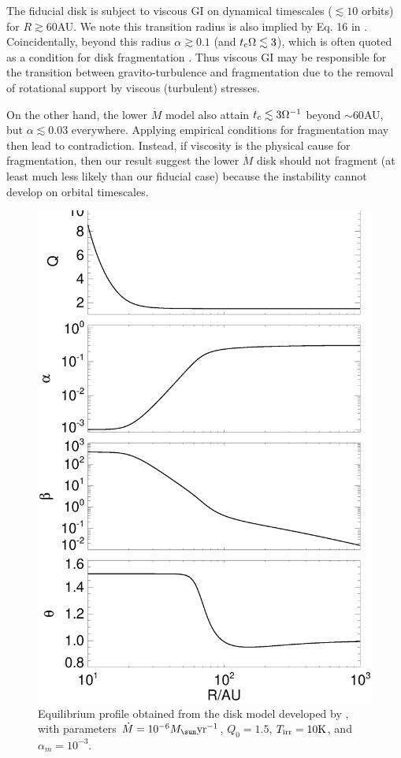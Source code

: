 The fiducial disk is subject to viscous GI on dynamical timescales
($\lesssim 10$ orbits) for $R\gtrsim60$AU. We note this transition
radius is also implied by Eq. 16 in \cite{kratter10}. Coincidentally,
beyond this radius $\alpha\gtrsim 0.1$ (and 
$t_\mathrm{c}\Omega\lesssim 3$), which is often quoted as a condition for disk
fragmentation   
. Thus viscous GI may be responsible for 
the transition between gravito-turbulence and fragmentation due to the
removal of rotational support by viscous (turbulent) stresses. 

On the other hand, the lower $\dot{M}$ model also attain $t_\mathrm{c}\lesssim
3\Omega^{-1}$ beyond $\sim 60$AU, but $\alpha\lesssim 0.03$
everywhere. 
Applying empirical conditions for fragmentation may then lead to
contradiction. Instead, if viscosity is the physical cause for
fragmentation, then our result suggest the lower $\dot{M}$ disk should
not fragment (at least much less likely than our fiducial case) 
because the instability cannot develop on orbital timescales. 

\begin{figure}
  \includegraphics[width=\linewidth,clip=true,trim=0cm 0cm 0cm
    0.0cm]{figures/ppd_2d_basic}
  \caption{Equilibrium profile obtained from the disk model developed
    by \cite{rafikov15}, with parameters $\dot{M} =
    10^{-6}M_\sun\yr^{-1}$, $Q_0=1.5$, $T_\mathrm{irr}=10\mathrm{K}$, and
    $\alpha_m=10^{-3}$.   
    \label{rafikov_model}}
\end{figure}

